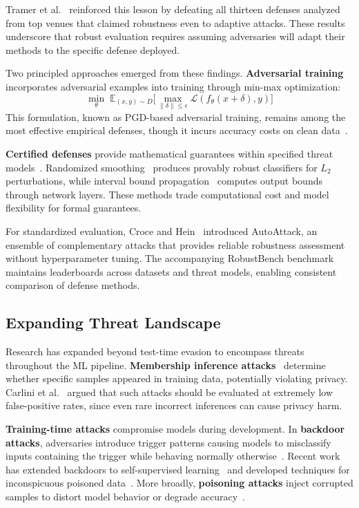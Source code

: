 \documentclass[11pt,a4paper]{article}
\begin{document}
Tramer et al.~\citep{tramer2020adaptive} reinforced this lesson by defeating all thirteen defenses analyzed from top venues that claimed robustness even to adaptive attacks. These results underscore that robust evaluation requires assuming adversaries will adapt their methods to the specific defense deployed.

Two principled approaches emerged from these findings. \textbf{Adversarial training}~\citep{madry2018towards} incorporates adversarial examples into training through min-max optimization:
\[
\min_{\theta} \;\mathbb{E}_{(x,y) \sim D} \Big[ \max_{\|\delta\| \leq \epsilon} \mathcal{L}(f_{\theta}(x + \delta), y) \Big]
\]
This formulation, known as PGD-based adversarial training, remains among the most effective empirical defenses, though it incurs accuracy costs on clean data~\citep{tsipras2019robustness, zhang2019tradeoff}.

\textbf{Certified defenses} provide mathematical guarantees within specified threat models~\citep{li2020sok}. Randomized smoothing~\citep{cohen2019certified} produces provably robust classifiers for $L_2$ perturbations, while interval bound propagation~\citep{gowal2018effectiveness} computes output bounds through network layers. These methods trade computational cost and model flexibility for formal guarantees.

For standardized evaluation, Croce and Hein~\citep{croce2020reliable} introduced AutoAttack, an ensemble of complementary attacks that provides reliable robustness assessment without hyperparameter tuning. The accompanying RobustBench benchmark~\citep{croce2021robustbench} maintains leaderboards across datasets and threat models, enabling consistent comparison of defense methods.

\subsection{Expanding Threat Landscape}

Research has expanded beyond test-time evasion to encompass threats throughout the ML pipeline. \textbf{Membership inference attacks}~\citep{shokri2017membership, ye2021enhanced} determine whether specific samples appeared in training data, potentially violating privacy. Carlini et al.~\citep{carlini2022membership} argued that such attacks should be evaluated at extremely low false-positive rates, since even rare incorrect inferences can cause privacy harm.

\textbf{Training-time attacks} compromise models during development. In \textbf{backdoor attacks}, adversaries introduce trigger patterns causing models to misclassify inputs containing the trigger while behaving normally otherwise~\citep{gu2017badnets}. Recent work has extended backdoors to self-supervised learning~\citep{jia2021badencoder} and developed techniques for inconspicuous poisoned data~\citep{tao2024distribution}. More broadly, \textbf{poisoning attacks} inject corrupted samples to distort model behavior or degrade accuracy~\citep{tramer2022truth}.
\end{document}
